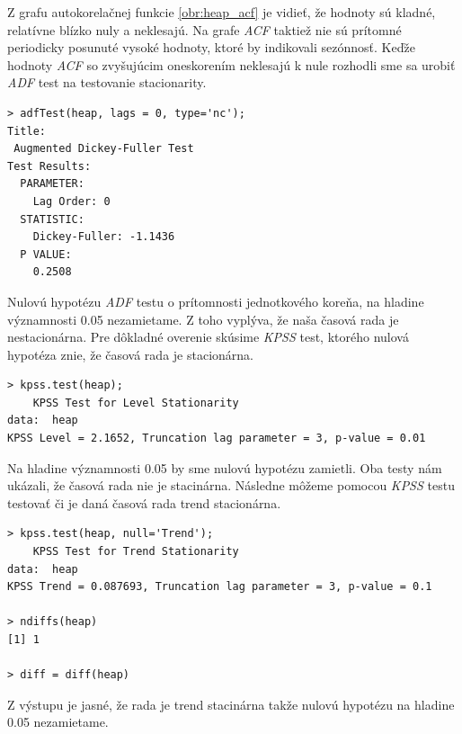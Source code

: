 \documentclass[12pt,a4paper,oneside,final]{article}
\theoremstyle{definition}
\theoremstyle{remark}
\numberwithin{equation}{section}
\begin{document}
Z grafu autokorelačnej funkcie \ref{obr:heap_acf} je vidieť, že hodnoty sú kladné,
relatívne blízko nuly a neklesajú. 
Na grafe \emph{ACF} taktiež nie sú prítomné periodicky posunuté vysoké hodnoty, 
ktoré by indikovali sezónnosť.
Keďže hodnoty \emph{ACF} so zvyšujúcim oneskorením neklesajú k nule rozhodli sme sa urobiť
\emph{ADF} test na testovanie stacionarity.

\begin{minipage}{\linewidth}
\begingroup
\fontsize{9pt}{7pt}\selectfont  %
\begin{verbatim}
> adfTest(heap, lags = 0, type='nc');
Title:
 Augmented Dickey-Fuller Test
Test Results:
  PARAMETER:
    Lag Order: 0
  STATISTIC:
    Dickey-Fuller: -1.1436
  P VALUE:
    0.2508 
\end{verbatim}
\endgroup
\end{minipage}

Nulovú hypotézu \emph{ADF} testu o prítomnosti jednotkového koreňa, na hladine významnosti 0.05
nezamietame. Z toho vyplýva, že naša časová rada je nestacionárna. Pre dôkladné 
overenie skúsime \emph{KPSS} test, ktorého nulová hypotéza znie, že časová rada je stacionárna.

\begin{minipage}{\linewidth}
\begingroup
\fontsize{9pt}{7pt}\selectfont %
\begin{verbatim}
> kpss.test(heap);
	KPSS Test for Level Stationarity
data:  heap
KPSS Level = 2.1652, Truncation lag parameter = 3, p-value = 0.01
\end{verbatim}
\endgroup
\end{minipage}

Na hladine významnosti 0.05 by sme nulovú hypotézu zamietli. Oba testy nám ukázali, že časová
rada nie je stacinárna. 
Následne môžeme pomocou \emph{KPSS} testu testovať či je daná časová rada trend stacionárna.

\begin{minipage}{\linewidth}
\begingroup
\fontsize{9pt}{7pt}\selectfont %
\begin{verbatim}
> kpss.test(heap, null='Trend');
	KPSS Test for Trend Stationarity
data:  heap
KPSS Trend = 0.087693, Truncation lag parameter = 3, p-value = 0.1

> ndiffs(heap)
[1] 1

> diff = diff(heap)
\end{verbatim}
\endgroup
\end{minipage}

Z výstupu je jasné, že rada je trend stacinárna takže nulovú hypotézu na hladine 0.05
nezamietame.
\end{document}
